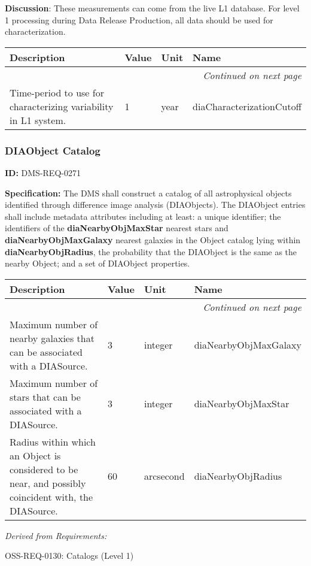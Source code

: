 \documentclass[SE,toc,lsstdraft]{lsstdoc}
\makeatletter
\newcommand{\paramname}[1]{\hspace{0pt}#1}
\newcommand{\unitname}[1]{\hspace{0pt}#1}
\newenvironment{parameters}[0]{%
\setlength\LTleft{0pt}
\setlength\LTright{\fill}
\begin{small}
\begin{longtable}[]{|p{0.5\textwidth}|l|p{0.6in}|p{1.74in}@{}|}

\hline \textbf{Description} & \textbf{Value} & \textbf{Unit} & \textbf{Name} \\ \hline
\endhead

\hline \multicolumn{4}{r}{\emph{Continued on next page}} \\
\endfoot

\hline\hline
\endlastfoot
}{%
\hline
\end{longtable}
\end{small}
}
\makeatother
\begin{document}
\textbf{Discussion}: These measurements can come from the live L1 database. For level 1 processing during Data Release Production, all data should be used for characterization.



\begin{parameters}
Time-period to use for characterizing variability in L1 system.
&
1
&
\unitname{%
year
}
&
\paramname{%
diaCharacterizationCutoff
} \\\hline
\end{parameters}




\subsubsection{DIAObject Catalog}

\label{DMS-REQ-0271}
\textbf{ID:} DMS-REQ-0271

\textbf{Specification:} The DMS shall construct a catalog of all astrophysical objects identified through difference image analysis (DIAObjects). The DIAObject entries shall include metadata attributes including at least: a unique identifier; the identifiers of the\textbf{ diaNearbyObjMaxStar} nearest stars and \textbf{diaNearbyObjMaxGalaxy} nearest galaxies in the Object catalog lying within \textbf{diaNearbyObjRadius}, the probability that the DIAObject is the same as the nearby Object; and a set of DIAObject properties.





\begin{parameters}
Maximum number of nearby galaxies that can be associated with a DIASource.
&
3
&
\unitname{%
integer
}
&
\paramname{%
diaNearbyObjMaxGalaxy
} \\\hline
Maximum number of stars that can be associated with a DIASource.
&
3
&
\unitname{%
integer
}
&
\paramname{%
diaNearbyObjMaxStar
} \\\hline
Radius within which an Object is considered to be near, and possibly coincident with, the DIASource.
&
60
&
\unitname{%
arcsecond
}
&
\paramname{%
diaNearbyObjRadius
} \\\hline
\end{parameters}




\emph{Derived from Requirements:}

OSS-REQ-0130:
Catalogs (Level 1) \newline
\end{document}
